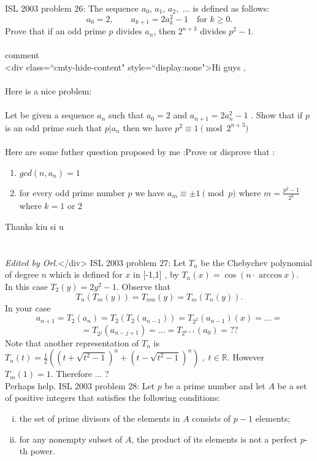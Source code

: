 ISL 2003 problem 26:  The sequence $a_0$, $a_1$, $a_2,$ $\ldots$ is defined as follows:
\[ a_0=2, \qquad a_{k+1}=2a_k^2-1 \quad\text{for }k \geq 0. \]
Prove that if an odd prime $p$ divides $a_n$, then $2^{n+3}$ divides $p^2-1$. \\\\
comment \\
<div class=``cmty-hide-content" style=``display:none">Hi guys , \\\\
Here is a nice problem: \\\\
Let be given a sequence $a_n$ such that $a_0=2$ and $a_{n+1}=2a_n^2-1$ . Show that if $p$ is an odd prime such that $p|a_n$ then we have $p^2\equiv 1\pmod{2^{n+3}}$ \\\\
Here are some futher question proposed by me :Prove or disprove that :
\begin{enumerate}[1)]
  \item $gcd(n,a_n)=1$
  \item for every odd prime number $p$ we have $a_m\equiv \pm 1\pmod{p}$ where $m=\frac{p^2-1}{2^k}$ where $k=1$ or $2$
\end{enumerate}
Thanks kiu si u \\\\\\
\textit{Edited by Orl.}</div> 
ISL 2003 problem 27:  Let  $ T_n $ be the Chebychev polynomial of degree $ n $ which is defined for $ x $  in [-1,1] , by $T_n(x)=\cos\left(n\cdot \arccos{x}\right) $. \\
In this case  $  T_2(y)=2y^2-1 . $ Observe that
\[ T_n\left(T_m(y)\right)=T_{nm}(y)=T_m\left(T_n(y)\right). \]
In your case
\[ a_{n+1}=T_2(a_n)=
T_2\left(T_2(a_{n-1})\right)=T_{2^2}(a_{n-1})(x)=...= \]
\[ =T_{2^j}(a_{n-j+1})=...=T_{2^{n+1}}(a_0)= ?? \]
Note that another representation of $ T_n $ is  $
T_n(t)=\frac{1}{2}\left( (t+\sqrt{t^2-1})^n+ (t-\sqrt{t^2-1})^n\right)\; ,\; 
t\in {\mathbb  R}. $ However $ T_m(1)=1 .$ Therefore ... ? \\
Perhaps help. 
ISL 2003 problem 28:  Let $p$ be a prime number and let $A$ be a set of positive integers that satisfies the following conditions:
\begin{enumerate}[(i)]
  \item the set of prime divisors of the elements in $A$ consists of $p-1$ elements;
  \item for any nonempty subset of $A$, the product of its elements is not a perfect $p$-th power.
\end{enumerate}
